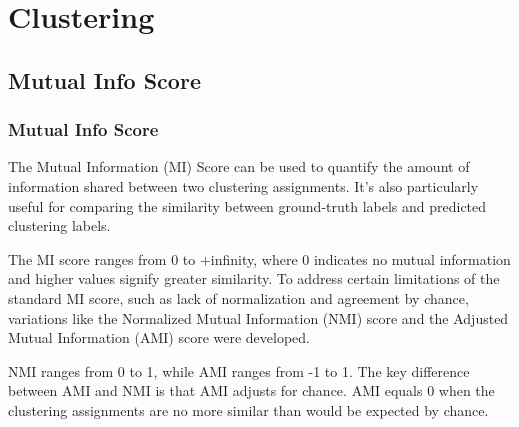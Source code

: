 \chapter{Clustering}


\clearpage
\thispagestyle{clusteringstyle}
\section{Mutual Info Score}
\subsection{Mutual Info Score}

The Mutual Information (MI) Score can be used to quantify the amount of information shared between two clustering assignments.
It's also particularly useful for comparing the similarity between ground-truth labels and predicted clustering labels.

\begin{center}
\end{center}

The MI score ranges from 0 to +infinity, where 0 indicates no mutual information and higher values signify greater
similarity. To address certain limitations of the standard MI score, such as lack of normalization and agreement by chance, variations like the
Normalized Mutual Information (NMI) score and the Adjusted Mutual Information (AMI) score were developed.

NMI ranges from 0 to 1, while AMI ranges from -1 to 1. The key difference between AMI and NMI is that AMI adjusts for chance. 
AMI equals 0 when the clustering assignments are no more similar than would be expected by chance.

